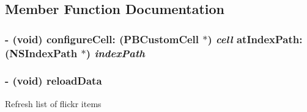 \subsection{Member Function Documentation}
\hypertarget{interface_p_b_master_view_controller_aa68b0153bbe1a609854ca5309dceec04}{
\subsubsection[{configureCell:atIndexPath:}]{\setlength{\rightskip}{0pt plus 5cm}-\/ (void) configureCell: ({\bf PBCustomCell} $\ast$) {\em cell}\/ atIndexPath: (NSIndexPath $\ast$) {\em indexPath}}}
\label{interface_p_b_master_view_controller_aa68b0153bbe1a609854ca5309dceec04}
\hypertarget{interface_p_b_master_view_controller_acb794e1bf10659381af948267f5d7db3}{
\subsubsection[{reloadData}]{\setlength{\rightskip}{0pt plus 5cm}-\/ (void) reloadData }}
\label{interface_p_b_master_view_controller_acb794e1bf10659381af948267f5d7db3}
Refresh list of flickr items 

